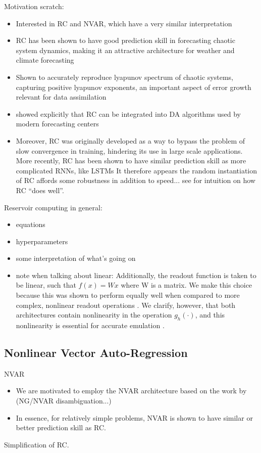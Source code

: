 Motivation scratch:
\begin{itemize}
    \item Interested in RC and NVAR, which have a very similar interpretation
    \item RC has been shown to have good prediction skill in forecasting chaotic
        system dynamics, making it an attractive architecture for weather and
        climate forecasting
    \item Shown to accurately reproduce lyapunov spectrum of chaotic systems,
        capturing positive lyapunov exponents, an important aspect of error
        growth relevant for data assimilation
    \item \citep{penny_integrating_2022} showed explicitly that RC can be
        integrated into DA algorithms used by modern forecasting centers
    \item Moreover,
        RC was originally developed as a way to bypass the problem of slow
        convergence in training, hindering its use in large scale applications.
        More recently,
        RC has been shown to have similar prediction skill as more
        complicated
        RNNs, like LSTMs \citep{vlachas_backpropagation_2020}
        It therefore appears the random instantiation of RC affords some
        robustness in addition to speed... see \citet{bollt_explaining_2021} for
        intuition on how RC ``does well''.
\end{itemize}

Reservoir computing in general:
\begin{itemize}
    \item equations
    \item hyperparameters
    \item some interpretation of what's going on
    \item note when talking about linear:
        Additionally, the readout function is taken to be linear, such that
        $f(x) = Wx$ where W is a matrix. We make this choice because
        this was shown to perform equally well when compared to more complex,
        nonlinear readout operations \citep{platt_systematic_2022}.
        We clarify, however, that both architectures contain nonlinearity in
        the operation $g_h(\cdot)$, and this nonlinearity is essential for
        accurate emulation  \citep{bollt_explaining_2021}.
\end{itemize}

\subsection{Nonlinear Vector Auto-Regression}
\label{subsec:nvar}

NVAR
\begin{itemize}
    \item We are motivated to employ the NVAR architecture based on the work by
        \citep{gauthier_next_2021} (NG/NVAR disambiguation...)
    \item In essence, for relatively simple problems, NVAR is shown to have
        similar or better prediction skill as RC.
\end{itemize}

Simplification of RC.

